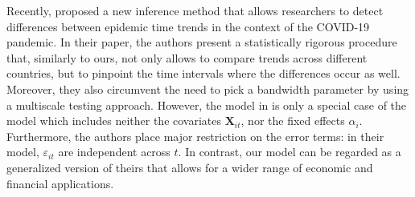 \documentclass[a4paper,12pt]{article}
\makeatletter
\renewcommand{\eqref}[1]{\tagform@{\ref{#1}}}
\makeatother
\begin{document}
Recently, \cite{KhismatullinaVogt2021} proposed a new inference method that allows researchers to detect differences between epidemic time trends in the context of the COVID-19 pandemic. In their paper, the authors present a statistically rigorous procedure that, similarly to ours, not only allows to compare trends across different countries, but to pinpoint the time intervals where the differences occur as well. Moreover, they also circumvent the need to pick a bandwidth parameter by using a multiscale testing approach. However, the model in \cite{KhismatullinaVogt2021} is only a special case of the model \eqref{eq:model} which includes neither the covariates $\mathbf{X}_{it}$, nor the fixed effects $\alpha_i$. Furthermore, the authors place major restriction on the error terms: in their model, $\varepsilon_{it}$ are independent across $t$. In contrast, our model \eqref{eq:model} can be regarded as a generalized version of theirs that allows for a wider range of economic and financial applications.


\end{document}
